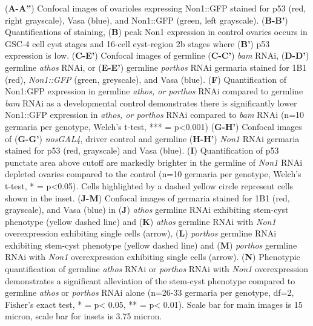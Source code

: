 \documentclass[12pt,oneside]{reedthesis}
\begin{document}
(\textbf{A-A''}) Confocal images of
ovarioles expressing Non1::GFP stained for p53 (red, right grayscale),
Vasa (blue), and Non1::GFP (green, left grayscale). (\textbf{B-B'})
Quantifications of staining, (\textbf{B}) peak Non1 expression in control
ovaries occurs in GSC-4 cell cyst stages and 16-cell cyst-region 2b
stages where (\textbf{B'}) p53 expression is low. (\textbf{C-E'}) Confocal images
of germline (\textbf{C-C'}) \emph{bam} RNAi, (\textbf{D-D'}) germline \emph{athos} RNAi, or
(\textbf{E-E'}) germline \emph{porthos} RNAi germaria stained for 1B1 (red),
\emph{Non1::GFP} (green, greyscale), and Vasa (blue). (\textbf{F}) Quantification
of Non1:GFP expression in germline \emph{athos, or porthos} RNAi compared to
germline \emph{bam} RNAi as a developmental control demonstrates there is
significantly lower Non1::GFP expression in \emph{athos, or porthos} RNAi
compared to \emph{bam} RNAi (n=10 germaria per genotype, Welch's t-test,
*** = p\textless0.001) (\textbf{G-H'}) Confocal images of (\textbf{G-G'}) \emph{nosGAL4},
driver control and germline (\textbf{H-H'}) \emph{Non1} RNAi germaria stained for
p53 (red, grayscale) and Vasa (blue). (\textbf{I}) Quantification of p53
punctate area above cutoff are markedly brighter in the germline of
\emph{Non1} RNAi depleted ovaries compared to the control (n=10 germaria per
genotype, Welch's t-test, * = p\textless0.05). Cells highlighted by a dashed
yellow circle represent cells shown in the inset. (\textbf{J-M}) Confocal
images of germaria stained for 1B1 (red, grayscale), and Vasa (blue) in
(\textbf{J}) \emph{athos} germline RNAi exhibiting stem-cyst phenotype (yellow
dashed line) and (\textbf{K}) \emph{athos} germline RNAi with \emph{Non1}
overexpression exhibiting single cells (arrow), (\textbf{L}) \emph{porthos}
germline RNAi exhibiting stem-cyst phenotype (yellow dashed line) and
(\textbf{M}) \emph{porthos} germline RNAi with \emph{Non1} overexpression exhibiting
single cells (arrow). (\textbf{N}) Phenotypic quantification of germline
\emph{athos} RNAi or \emph{porthos} RNAi with \emph{Non1} overexpression demonstrates a
significant alleviation of the stem-cyst phenotype compared to germline
\emph{athos} or \emph{porthos} RNAi alone (n=26-33 germaria per genotype, df=2,
Fisher's exact test, * = p\textless{} 0.05, ** = p\textless{} 0.01). Scale bar for main
images is 15 micron, scale bar for insets is 3.75 micron.
\end{document}
